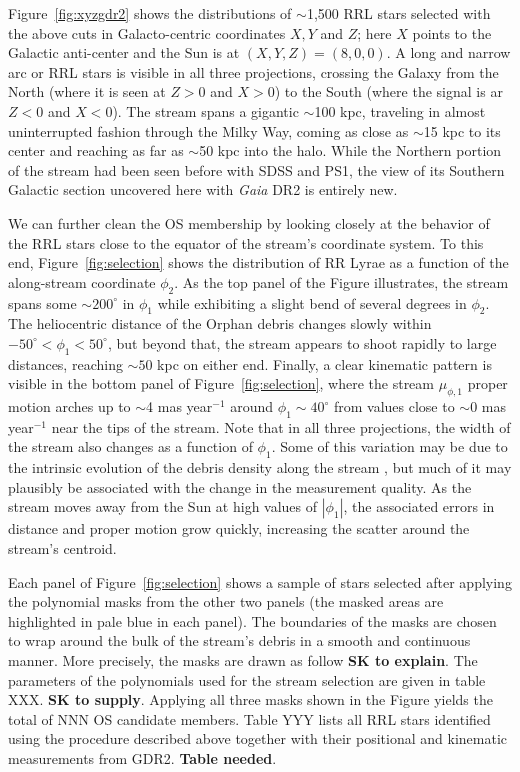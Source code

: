\documentclass[a4paper,useAMS,usenatbib]{mnras}
\newcommand{\gaia}{\textit{Gaia} }
\begin{document}
Figure~\ref{fig:xyzgdr2} shows the distributions of $\sim$1,500 RRL
stars selected with the above cuts in Galacto-centric coordinates
$X,Y$ and $Z$; here $X$ points to the Galactic anti-center and the Sun
is at $(X,Y,Z)=(8,0,0)$. A long and narrow arc or RRL stars is visible
in all three projections, crossing the Galaxy from the North (where it
is seen at $Z>0$ and $X>0$) to the South (where the signal is ar $Z<0$
and $X<0$). The stream spans a gigantic $\sim$100 kpc, traveling in
almost uninterrupted fashion through the Milky Way, coming as close as
$\sim$15 kpc to its center and reaching as far as $\sim$50 kpc into
the halo. While the Northern portion of the stream had been seen
before with SDSS and PS1, the view of its Southern Galactic section
uncovered here with \gaia DR2 is entirely new.

We can further clean the OS membership by looking closely at the
behavior of the RRL stars close to the equator of the stream's
coordinate system. To this end, Figure~\ref{fig:selection} shows the
distribution of RR Lyrae as a function of the along-stream coordinate
$\phi_2$. As the top panel of the Figure illustrates, the stream spans
some $\sim200^{\circ}$ in $\phi_1$ while exhibiting a slight bend of
several degrees in $\phi_2$. The heliocentric distance of the Orphan
debris changes slowly within $-50^{\circ}<\phi_1<50^{\circ}$, but
beyond that, the stream appears to shoot rapidly to large distances,
reaching $\sim50$ kpc on either end. Finally, a clear kinematic
pattern is visible in the bottom panel of Figure~\ref{fig:selection},
where the stream $\mu_{\phi,1}$ proper motion arches up to $\sim$4 mas
year$^{-1}$ around $\phi_1\sim40^{\circ}$ from values close to $\sim0$
mas year$^{-1}$ near the tips of the stream. Note that in all three
projections, the width of the stream also changes as a function of
$\phi_1$. Some of this variation may be due to the intrinsic evolution
of the debris density along the stream \citep[see e.g.][]{stray}, but
much of it may plausibly be associated with the change in the
measurement quality. As the stream moves away from the Sun at high
values of $|\phi_1|$, the associated errors in distance and proper
motion grow quickly, increasing the scatter around the stream's
centroid. 

Each panel of Figure~\ref{fig:selection} shows a sample of stars
selected after applying the polynomial masks from the other two panels
(the masked areas are highlighted in pale blue in each panel). The
boundaries of the masks are chosen to wrap around the bulk of the
stream's debris in a smooth and continuous manner. More precisely, the
masks are drawn as follow {\bf SK to explain}. The parameters of the
polynomials used for the stream selection are given in table XXX. {\bf
  SK to supply}. Applying all three masks shown in the Figure yields
the total of NNN OS candidate members. Table YYY lists all RRL stars
identified using the procedure described above together with their
positional and kinematic measurements from GDR2. {\bf Table
  needed}.
\end{document}
